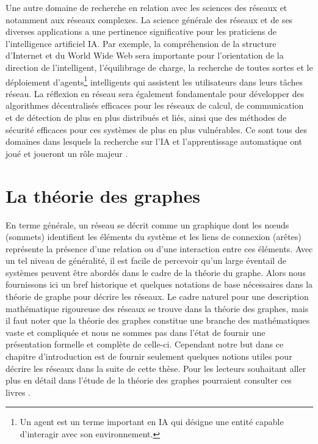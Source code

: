 Une autre domaine de recherche en relation avec les sciences des réseaux et notamment aux réseaux complexes. La science générale des réseaux et de ses diverses applications a une pertinence significative pour les praticiens de l'intelligence artificiel IA. Par exemple, la compréhension de la structure d'Internet et du World Wide Web sera importante pour l'orientation de la direction de l'intelligent, l'équilibrage de charge, la recherche de toutes sortes et le déploiement d'agents\footnote{Un agent est un terme important en IA qui désigne une entité capable d’interagir avec
	son environnement.} intelligents qui assistent les utilisateurs dans leurs tâches réseau. La réflexion en réseau sera également fondamentale pour développer des algorithmes décentralisés efficaces pour les réseaux de calcul, de communication et de détection de plus en plus distribués et liés, ainsi que des méthodes de sécurité efficaces pour ces systèmes de plus en plus vulnérables. Ce sont tous des domaines dans lesquels la recherche sur l'IA et l'apprentissage automatique ont joué et joueront un rôle majeur \cite{Mitchell2006,Basheer-Hajmeerb2000,Passerini-al2017}.

\section{La théorie des graphes}
En terme générale, un réseau se décrit comme un graphique dont les nœuds (sommets) identifient les éléments du
système et les liens de connexion (arêtes) représente la présence d'une relation ou d'une interaction entre ces
éléments. Avec un tel niveau de généralité, il est facile de percevoir qu'un large éventail de systèmes peuvent être abordés
dans le cadre de la théorie du graphe. Alors nous fournissons ici un bref historique et quelques notations de base nécessaires
dans la théorie de graphe pour décrire les réseaux. Le cadre naturel pour une description mathématique rigoureuse des réseaux
se trouve dans la théorie des graphes, mais il faut noter que la théorie des graphes 
constitue une branche des mathématiques vaste et compliquée et nous ne sommes pas dans l'état de fournir une présentation formelle et complète de 
celle-ci. Cependant notre but dans ce chapitre d'introduction est de fournir seulement quelques notions utiles pour décrire 
les réseaux dans la suite de cette thèse. Pour les lecteurs souhaitant aller plus en détail dans l'étude de la théorie des graphes pourraient consulter ces livres \cite{Ha1995,West1996}.
